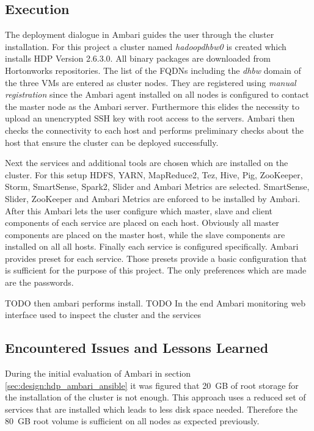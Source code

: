 \subsection{Execution}

The deployment dialogue in Ambari guides the user through the cluster installation.
For this project a cluster named \emph{hadoopdhbw0} is created which installs \ac{HDP} Version 2.6.3.0. All binary packages are downloaded from Hortonworks repositories.
The list of the \acp{FQDN} including the \emph{dhbw} domain of the three \acp{VM} are entered as cluster nodes. They are registered using \emph{manual registration} since the Ambari agent installed on all nodes is configured to contact the master node as the Ambari server. Furthermore this elides the necessity to upload an unencrypted \ac{SSH} key with root access to the servers.
Ambari then checks the connectivity to each host and performs preliminary checks about the host that ensure the cluster can be deployed successfully.

Next the services and additional tools are chosen which are installed on the cluster.
For this setup \ac{HDFS}, \ac{YARN}, MapReduce2, Tez, Hive, Pig, ZooKeeper, Storm, SmartSense, Spark2, Slider and Ambari Metrics are selected. SmartSense, Slider, ZooKeeper and Ambari Metrics are enforced to be installed by Ambari. 
After this Ambari lets the user configure which master, slave and client components of each service are placed on each host.
Obviously all master components are placed on the master host, while the slave components are installed on all all hosts.
Finally each service is configured specifically. 
Ambari provides preset for each service.
Those presets provide a basic configuration that is sufficient for the purpose of this project. 
The only preferences which are made are the passwords.

TODO then ambari performs install.
TODO In the end Ambari monitoring web interface used to inspect the cluster and the services


\subsection{Encountered Issues and Lessons Learned}

During the initial evaluation of Ambari in section \vref{sec:design:hdp_ambari_ansible} it was figured that 20~\ac{GB} of root storage for the installation of the cluster is not enough. This approach uses a reduced set of services that are installed which leads to less disk space needed. Therefore the 80~\ac{GB} root volume is sufficient on all nodes as expected previously.

